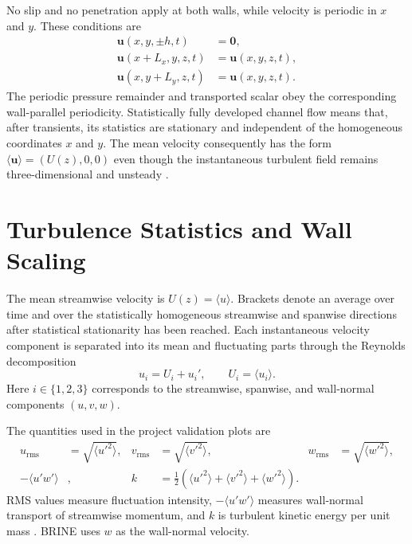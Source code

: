 No slip and no penetration apply at both walls, while velocity is periodic in
$x$ and $y$. These conditions are
\begin{equation}
  \begin{aligned}
    \mathbf{u}(x,y,\pm h,t)&=\mathbf{0},\\
    \mathbf{u}(x+L_x,y,z,t)&=\mathbf{u}(x,y,z,t),\\
    \mathbf{u}(x,y+L_y,z,t)&=\mathbf{u}(x,y,z,t).
  \end{aligned}
  \label{eq:channel-boundary-conditions}
\end{equation}
The periodic pressure remainder and transported scalar obey the corresponding
wall-parallel periodicity. Statistically fully developed channel flow means
that, after transients, its statistics are stationary and independent of the
homogeneous coordinates $x$ and $y$. The mean velocity consequently has the
form $\langle\mathbf{u}\rangle=(U(z),0,0)$ even though the instantaneous
turbulent field remains three-dimensional and unsteady
\cite{kimMoinMoser1987}.

\section{Turbulence Statistics and Wall Scaling}
\label{sec:turbulence-statistics-wall-scaling}

The mean streamwise velocity is $U(z)=\langle u\rangle$. Brackets denote an
average over time and over the statistically homogeneous streamwise and
spanwise directions after statistical stationarity has been reached. Each
instantaneous velocity component is separated into its mean and fluctuating
parts through the Reynolds decomposition
\begin{equation}
  u_i=U_i+u_i',
  \qquad
  U_i=\langle u_i\rangle .
  \label{eq:channel-average-reynolds-decomposition}
\end{equation}
Here $i\in\{1,2,3\}$ corresponds to the streamwise, spanwise, and wall-normal
components $(u,v,w)$.

The quantities used in the project validation plots are
\begin{equation}
  \begin{aligned}
    u_{\mathrm{rms}}&=\sqrt{\langle u'^2\rangle},
    &v_{\mathrm{rms}}&=\sqrt{\langle v'^2\rangle},
    &w_{\mathrm{rms}}&=\sqrt{\langle w'^2\rangle},\\
    -\langle u'w'\rangle&,
    &k&=\frac{1}{2}\left(
      \langle u'^2\rangle+\langle v'^2\rangle+\langle w'^2\rangle
      \right).
  \end{aligned}
  \label{eq:velocity-validation-statistics}
\end{equation}
RMS values measure fluctuation intensity, $-\langle u'w'\rangle$ measures
wall-normal transport of streamwise momentum, and $k$ is turbulent kinetic
energy per unit mass \cite{pope2000,kimMoinMoser1987}. BRINE uses $w$ as the
wall-normal velocity.

